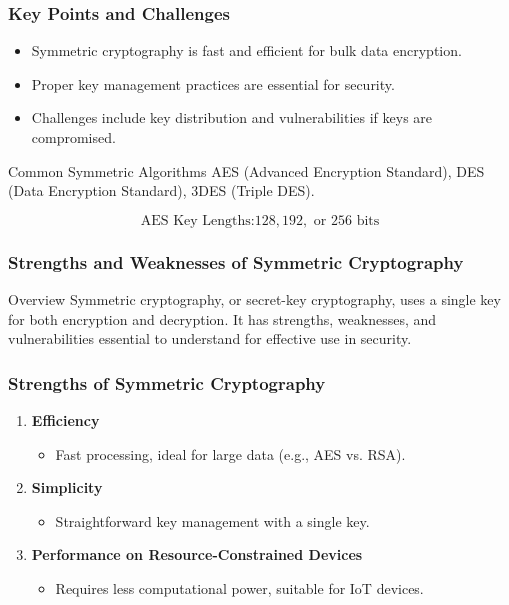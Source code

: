 \documentclass{beamer}
\begin{document}
\begin{frame}[fragile]
    \frametitle{Key Points and Challenges}
    \begin{itemize}
        \item Symmetric cryptography is fast and efficient for bulk data encryption.
        \item Proper key management practices are essential for security.
        \item Challenges include key distribution and vulnerabilities if keys are compromised.
    \end{itemize}
    
    \begin{block}{Common Symmetric Algorithms}
        AES (Advanced Encryption Standard), DES (Data Encryption Standard), 3DES (Triple DES).
    \end{block}

    \begin{equation}
        \text{AES Key Lengths:} 128, 192, \text{ or } 256 \text{ bits}
    \end{equation}
\end{frame}

\begin{frame}[fragile]
    \frametitle{Strengths and Weaknesses of Symmetric Cryptography}
    \begin{block}{Overview}
        Symmetric cryptography, or secret-key cryptography, uses a single key for both encryption and decryption. It has strengths, weaknesses, and vulnerabilities essential to understand for effective use in security.
    \end{block}
\end{frame}

\begin{frame}[fragile]
    \frametitle{Strengths of Symmetric Cryptography}
    \begin{enumerate}
        \item \textbf{Efficiency}
        \begin{itemize}
            \item Fast processing, ideal for large data (e.g., AES vs. RSA).
        \end{itemize}
        
        \item \textbf{Simplicity}
        \begin{itemize}
            \item Straightforward key management with a single key.
        \end{itemize}
        
        \item \textbf{Performance on Resource-Constrained Devices}
        \begin{itemize}
            \item Requires less computational power, suitable for IoT devices.
        \end{itemize}
    \end{enumerate}
\end{frame}
\end{document}
